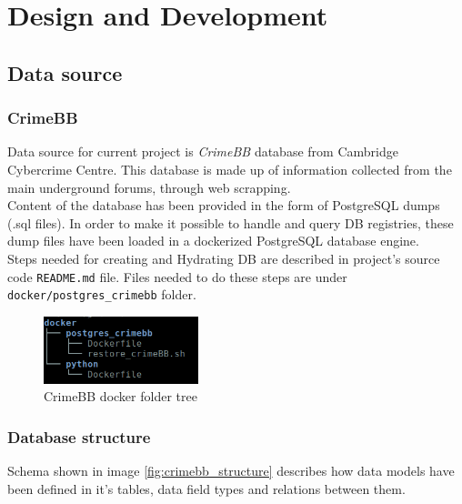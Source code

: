 \chapter{Design and Development}
\label{chapter:designanddevelopment}

\section{Data source}

\subsection{CrimeBB}

Data source for current project is \textit{CrimeBB} \cite{crimeBB} database from Cambridge Cybercrime Centre. This database is made up of information collected from the main underground forums, through web scrapping. \\
Content of the database has been provided in the form of PostgreSQL dumps (.sql files). In order to make it possible to handle and query DB registries, these dump files have been loaded in a dockerized PostgreSQL database engine. \\
Steps needed for creating and Hydrating DB are described in project's source code \texttt{README.md} file. Files needed to do these steps are under \texttt{docker/postgres\_crimebb} folder.

\begin{figure}
	\centering
	\includegraphics[width=0.4\textwidth]{figs/crimebb_tree.png}
	\caption{CrimeBB docker folder tree}
	\label{fig:crimebb_tree}
\end{figure}

\newpage

\subsection{Database structure}

Schema shown in image \ref{fig:crimebb_structure} describes how data models have been defined in it's tables, data field types and relations between them.

